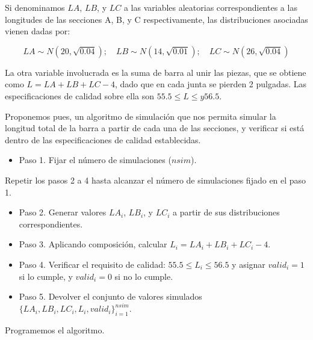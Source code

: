 \documentclass[
]{book}
\providecommand{\tightlist}{%
  \setlength{\itemsep}{0pt}\setlength{\parskip}{0pt}}
\newenvironment{silverbox}{
  \definecolor{shadecolor}{rgb}{192, 192, 192}  
  \color{black}
  \begin{shaded}}
 {\end{shaded}}
\theoremstyle{definition}
\theoremstyle{definition}
\theoremstyle{definition}
\theoremstyle{definition}
\theoremstyle{remark}
\begin{document}
Si denominamos \(LA\), \(LB\), y \(LC\) a las variables aleatorias correspondientes a las longitudes de las secciones A, B, y C respectivamente, las distribuciones asociadas vienen dadas por:

\[LA \sim N(20, \sqrt{0.04}); \quad LB \sim N(14, \sqrt{0.01}); \quad  LC \sim N(26, \sqrt{0.04})\]

La otra variable involucrada es la suma de barra al unir las piezas, que se obtiene como \(L=LA+LB+LC-4\), dado que en cada junta se pierden 2 pulgadas. Las especificaciones de calidad sobre ella son \(55.5 \leq L \leq y 56.5\).

Proponemos pues, un algoritmo de simulación que nos permita simular la longitud total de la barra a partir de cada una de las secciones, y verificar si está dentro de las especificaciones de calidad establecidas.

\begin{silverbox}

\begin{itemize}
\tightlist
\item
  Paso 1. Fijar el número de simulaciones (\(nsim\)).
\end{itemize}

Repetir los pasos 2 a 4 hasta alcanzar el número de simulaciones fijado en el paso 1.

\begin{itemize}
\item
  Paso 2. Generar valores \(LA_i\), \(LB_i\), y \(LC_i\) a partir de sus distribuciones correspondientes.\\
\item
  Paso 3. Aplicando composición, calcular \(L_i = LA_i + LB_i + LC_i - 4.\)
\item
  Paso 4. Verificar el requisito de calidad: \(55.5 \leq L_i \leq 56.5\) y asignar \(valid_i = 1\) si lo cumple, y \(valid_i = 0\) si no lo cumple.
\item
  Paso 5. Devolver el conjunto de valores simulados \(\{LA_i, LB_i, LC_i, L_i, valid_i\}_{i=1}^{nsim}.\)
\end{itemize}

\end{silverbox}

Programemos el algoritmo.
\end{document}
